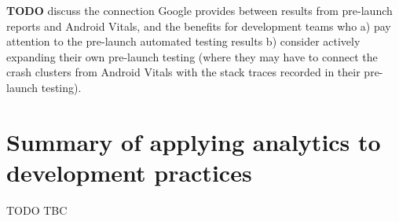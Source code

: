 \textbf{TODO} discuss the connection Google provides between results from pre-launch reports and Android Vitals, and the benefits for development teams who a) pay attention to the pre-launch automated testing results b) consider actively expanding their own pre-launch testing (where they may have to connect the crash clusters from Android Vitals with the stack traces recorded in their pre-launch testing).




\section{Summary of applying analytics to development practices}
TODO TBC
